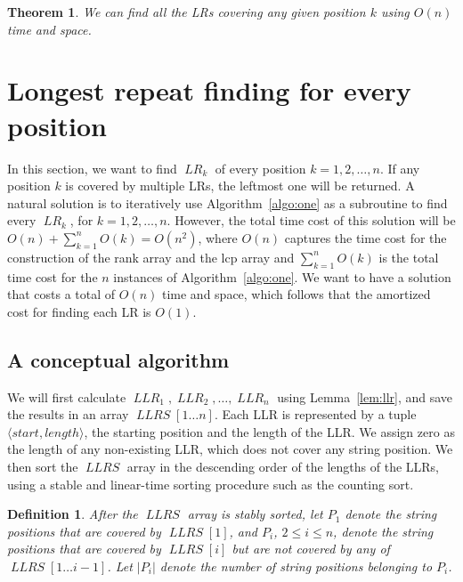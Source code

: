 \documentclass[preprint]{elsarticle}
\newtheorem{theorem}{Theorem}[section]
\newtheorem{definition}{Definition}[section]
\DeclareMathOperator{\lr}{\mathit{LR}}
\DeclareMathOperator{\llr}{\mathit{LLR}}
\DeclareMathOperator{\llrs}{\mathit{LLRS}}
\begin{document}
\begin{theorem}
\label{thm:one-all}
We can find all the LRs covering any given position $k$ using $O(n)$ time
and space.
\end{theorem}





\section{Longest repeat finding for every position}   
\label{sec:every}
In this section, we want to find $\lr_k$ of every position
$k=1,2,\ldots,n$. 
If any position $k$ is covered by multiple LRs, the
leftmost one will be returned.  
A natural solution is to iteratively use Algorithm~\ref{algo:one} as a
subroutine to find every $\lr_k$, for $k=1,2,\ldots,n$. However, the
total time cost of this solution will be $O(n)+\sum_{k=1}^n O(k) =
O(n^2)$, where $O(n)$ captures the time cost for the construction of
the rank array and the lcp array and $\sum_{k=1}^n O(k)$ is the total
time cost for the $n$ instances of Algorithm~\ref{algo:one}. We want to
have a solution that costs a total of $O(n)$ time and space, which follows
that the amortized cost for finding each LR is $O(1)$.

\subsection{A conceptual algorithm}
\label{subsec:overall}
We will first calculate $\llr_1,\llr_2,\ldots,\llr_n$ using
Lemma~\ref{lem:llr}, and save the results in an array $\llrs[1\ldots
n]$. Each LLR is represented by a tuple $\langle start,length\rangle$, the starting
position and the length of the LLR. We assign zero as the length of
any non-existing LLR, which does not cover any string position. We
then sort the $\llrs$ array in the descending order of the lengths of
the LLRs, using a stable and linear-time sorting procedure such as the
counting sort.  

\begin{definition}
\label{def:p}
After the $\llrs$ array is stably sorted, let $P_1$
denote the string positions that are covered by $\llrs[1]$, and $P_i$,
$2\leq i\leq n$, denote the string positions that are covered by
$\llrs[i]$ but are not covered by any of $\llrs[1\ldots i-1]$. Let
$|P_i|$ denote the number of string positions belonging to $P_i$.
\end{definition}
\end{document}
